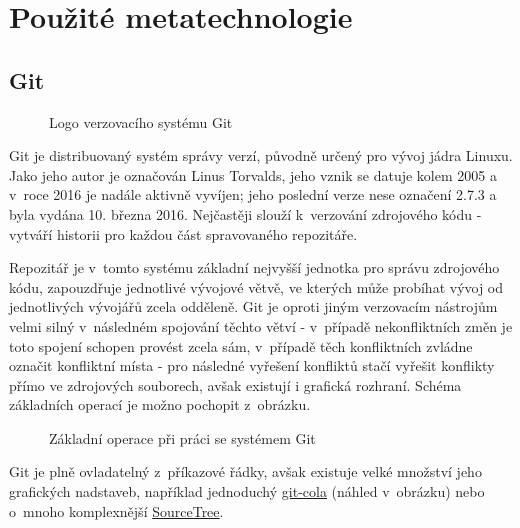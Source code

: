 \section{Použité metatechnologie}
\label{sec:used-metatechnologies}

\subsection{Git}
\label{subsec:git}

\begin{figure}
 \centering
 
 \caption{Logo verzovacího systému Git}
\end{figure}

Git je distribuovaný systém správy verzí, původně určený pro vývoj jádra Linuxu. Jako jeho autor je označován Linus Torvalds, jeho vznik se datuje kolem 2005 a v~roce 2016 je nadále aktivně vyvíjen; jeho poslední verze nese označení 2.7.3 a byla vydána 10. března 2016. Nejčastěji slouží k~verzování zdrojového kódu - vytváří historii pro každou část spravovaného repozitáře.

Repozitář je v~tomto systému základní nejvyšší jednotka pro správu zdrojového kódu, zapouzdřuje jednotlivé vývojové větvě, ve kterých může probíhat vývoj od jednotlivých vývojářů zcela odděleně. Git je oproti jiným verzovacím nástrojům velmi silný v~následném spojování těchto větví - v~případě nekonfliktních změn je toto spojení schopen provést zcela sám, v~případě těch konfliktních zvládne označit konfliktní místa - pro následné vyřešení konfliktů stačí vyřešit konflikty přímo ve zdrojových souborech, avšak existují i grafická rozhraní. Schéma základních operací je možno pochopit z~obrázku.

\begin{figure}[H]
 	\centering
 	
 	\caption[Základní operace při práci se systémem Git]{Základní operace při práci se systémem Git\cite{basic-git-svg}}
 	\label{fig:git-operations}
\end{figure}

Git je plně ovladatelný z~příkazové řádky, avšak existuje velké množství jeho grafických nadstaveb, například jednoduchý \href{http://git-cola.github.io/}{git-cola} (náhled v~obrázku) nebo o~mnoho komplexnější \href{https://www.sourcetreeapp.com/}{SourceTree}.

